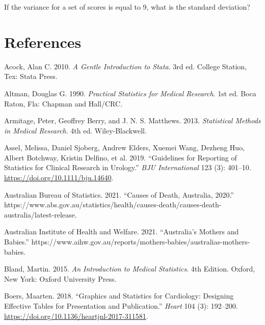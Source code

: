 \documentclass[
  a4paper,
]{memoir}
\newlength{\cslhangindent}
\newlength{\cslentryspacingunit} %
\newenvironment{CSLReferences}[2] %
 {%
  \setlength{\parindent}{0pt}
  \ifodd #1
  \let\oldpar\par
  \def\par{\hangindent=\cslhangindent\oldpar}
  \fi
  \setlength{\parskip}{#2\cslentryspacingunit}
 }%
 {}
\begin{document}
If the variance for a set of scores is equal to 9, what is the standard
deviation?


\hypertarget{references}{%
\chapter*{References}\label{references}}


\hypertarget{refs}{}
\begin{CSLReferences}{1}{0}
\leavevmode{}%
Acock, Alan C. 2010. \emph{A {Gentle Introduction} to {Stata}}. 3rd ed.
College Station, Tex: Stata Press.

\leavevmode{}%
Altman, Douglas G. 1990. \emph{Practical {Statistics} for {Medical
Research}}. 1st ed. Boca Raton, Fla: {Chapman and Hall/CRC}.

\leavevmode{}%
Armitage, Peter, Geoffrey Berry, and J. N. S. Matthews. 2013.
\emph{Statistical {Methods} in {Medical Research}}. 4th ed.
Wiley-Blackwell.

\leavevmode{}%
Assel, Melissa, Daniel Sjoberg, Andrew Elders, Xuemei Wang, Dezheng Huo,
Albert Botchway, Kristin Delfino, et al. 2019. {``Guidelines for
Reporting of Statistics for Clinical Research in Urology.''} \emph{BJU
International} 123 (3): 401--10.
\url{https://doi.org/10.1111/bju.14640}.

\leavevmode{}%
Australian Bureau of Statistics. 2021. {``Causes of {Death},
{Australia}, 2020.''}
https://www.abs.gov.au/statistics/health/causes-death/causes-death-australia/latest-release.

\leavevmode{}%
Australian Institute of Health and Welfare. 2021. {``Australia's Mothers
and Babies.''}
https://www.aihw.gov.au/reports/mothers-babies/australias-mothers-babies.

\leavevmode{}%
Bland, Martin. 2015. \emph{An {Introduction} to {Medical Statistics}}.
4th Edition. Oxford, New York: Oxford University Press.

\leavevmode{}%
Boers, Maarten. 2018. {``Graphics and Statistics for Cardiology:
Designing Effective Tables for Presentation and Publication.''}
\emph{Heart} 104 (3): 192--200.
\url{https://doi.org/10.1136/heartjnl-2017-311581}.


\end{CSLReferences}
\end{document}
